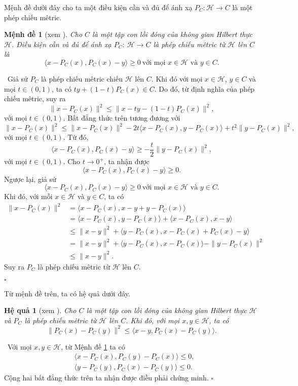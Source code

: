 \documentclass[14pt, oneside,A4paper]{book}
\theoremstyle{plain}
\newcommand{\eproof}{\hfill $\square$}
\newcommand{\chm}{{\bf  Chứng minh.}}
\newtheorem{md}[theorem]{Mệnh đề}
\newtheorem{hq}[theorem]{Hệ quả}
\begin{document}
Mệnh đề dưới đây cho ta một điều kiện cần và đủ để ánh xạ $P_C: \mathcal H\to C$ là một phép chiếu mêtric.
\begin{md}[xem \cite{AS}]\label{md12}
Cho $C$ là một tập con lồi đóng của không gian Hilbert thực $\mathcal H$. Điều kiện cần và đủ để ánh xạ $P_C:\ \mathcal H\longrightarrow C$ là phép chiếu mêtric từ $\mathcal H$ lên $C$ là
\begin{equation}\label{80}
\langle x-P_C(x),P_C(x)-y\rangle \geq 0\ \text{với mọi } x\in \mathcal H \text{ và }y\in C.
\end{equation}
\end{md} 
\noindent \chm \rm  \ Giả sử $P_C$ là phép chiếu mêtric chiếu $\mathcal H$ lên $C$. Khi đó với mọi $x\in \mathcal H$, $y\in C$ và mọi $t\in (0,1)$, ta có $t y +(1-t)P_C(x)\in C$. Do đó, từ định nghĩa của phép chiếu mêtric, suy ra
	$$\|x-P_C(x)\|^2\leq \|x-t y -(1-t)P_C(x)\|^2,$$
	với mọi $t\in (0,1)$. Bất đẳng thức trên tương đương với
	$$\|x-P_C(x)\|^2\leq\|x-P_C(x)\|^2 -2t\langle x-P_C(x), y-P_C(x)\rangle + t^2\|y-P_C(x)\|^2,$$
	với mọi $t\in (0,1)$. Từ đó,
	$$\langle x-P_C(x),P_C(x)-y\rangle\geq -\dfrac{t}{2}\Big \|y-P_C(x) \Big \|^2,$$
	với mọi $t\in (0,1)$. Cho $t\to 0^+$, ta nhận được
	$$\langle x-P_C(x),P_C(x)-y\rangle \geq 0.$$
	Ngược lại, giả sử 
	$$\langle x-P_C(x),P_C(x)-y\rangle \geq 0\ \text{với mọi } x\in \mathcal H \text{ và }y\in C.$$
	Khi đó, với mỗi $x\in \mathcal H$ và $y\in C$, ta có
	\begin{align*}
	\|x-P_C(x)\|^2&=\langle x-P_C(x), x-y+y-P_C(x)\rangle\\
	&=\langle x-P_C(x), y-P_C(x)\rangle +\langle x-P_C(x), x-y\rangle\\
	&\leq \|x-y\|^2 +\langle y-P_C(x), x-P_C(x)+P_C(x)-y\rangle\\
	&=\|x-y\|^2 +\langle y-P_C(x), x-P_C(x)\rangle -\|y-P_C(x)\|^2\\
	&\leq \|x-y\|^2.
	\end{align*}
	Suy ra $P_C$ là phép chiếu mêtric từ $\mathcal H$ lên $C$.

\eproof

Từ mệnh đề trên, ta có hệ quả dưới đây.
\begin{hq}[xem \cite{AS}] 
Cho $C$ là một tập con lồi đóng của không gian Hilbert thực $\mathcal H$ và $P_C$ là phép chiếu mêtric từ $\mathcal H$ lên $C$. Khi đó, với mọi $x,y\in \mathcal H$, ta có
$$\|P_C(x)-P_C(y)\|^2\leq \langle x-y,P_C(x)-P_C(y)\rangle.$$
\end{hq} 
\noindent \chm \rm  \ 
	Với mọi $x,y\in \mathcal H$, từ Mệnh đề \ref{md12} ta có
	\begin{align*}
	&\langle x-P_C(x), P_C(y)-P_C(x)\rangle \leq 0,\\
	&\langle y-P_C(y), P_C(x)-P_C(y)\rangle \leq 0.
	\end{align*}
	Cộng hai bất đẳng thức trên ta nhận được điều phải chứng minh.
\eproof
\end{document}
